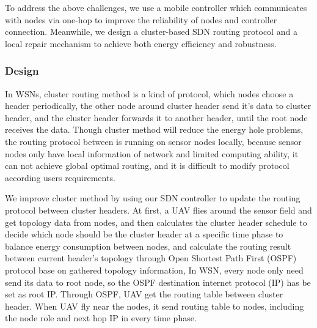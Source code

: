 To address the above challenges, we use a mobile controller which communicates with nodes via one-hop to improve the reliability of nodes and controller connection. Meanwhile, we design a cluster-based SDN routing protocol and a local repair mechanism to achieve both energy efficiency and robustness.

















\subsubsection{Design}
In WSNs, cluster routing method is a kind of protocol, which nodes choose a header periodically, the other node around cluster header send it's data to cluster header, and the cluster header forwards it to another header, until the root node receives the data. 
Though cluster method will reduce the energy hole problems, the routing protocol between is running on sensor nodes locally, because sensor nodes only have local information of network and limited computing ability, it can not achieve global optimal routing, and it is difficult to modify protocol according users requirements.

We improve cluster method by using our SDN controller to update the routing protocol between cluster headers. 
At first, a UAV flies around the sensor field and get topology data from nodes, 
and then calculates the cluster header schedule to decide which node should be the cluster header at a specific time phase 
to balance energy consumption between nodes, and calculate the routing result between current header's topology through
Open Shortest Path First (OSPF) protocol base on gathered topology information, In WSN, every node only need send its data to root node, so the OSPF destination internet protocol (IP) has be set as root IP. Through OSPF, UAV get the routing table between cluster header. When UAV fly near the nodes, it send routing table to nodes, including the node role and next hop IP in every time phase.

